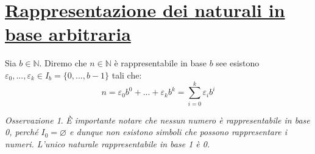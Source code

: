 \documentclass[oneside]{book}
\theoremstyle{remark}
\newtheorem*{osservaz}{Osservazione}
\newcommand{\teorema}[1]{\section{\underline{#1}}}
\begin{document}
\teorema{Rappresentazione dei naturali in base arbitraria}
\begin{tcolorbox}[colback=yellow!30, colframe=yellow!30!black, title=Rappresentabilità dei naturali in base arbitraria]
Sia $b\in\mathbb{N}$. Diremo che $n\in\mathbb{N}$ è rappresentabile in base $b$ see
esistono $\varepsilon_0,...,\varepsilon_k\in I_b=\{0,...,b-1\}$ tali che:
\[ n=\varepsilon_0b^0+...+\varepsilon_k b^k = \sum_{i=0}^{k}\varepsilon_ib^i \]
\end{tcolorbox}

\begin{osservaz}
\emph{È importante notare che nessun numero è rappresentabile in base 0, perché
$I_0 = \varnothing$ e dunque non esistono simboli che possono rappresentare
i numeri. L'unico naturale rappresentabile in base 1 è 0.}
\end{osservaz}
\end{document}
